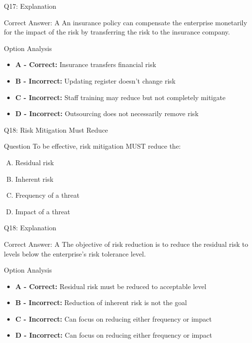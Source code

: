 \documentclass{beamer}
\begin{document}
	\begin{frame}{Q17: Explanation}
		\begin{block}{Correct Answer: A}
			An insurance policy can compensate the enterprise monetarily for the impact of the risk by transferring the risk to the insurance company.
		\end{block}
		\begin{block}{Option Analysis}
			\begin{itemize}
				\item \textbf{A - Correct:} Insurance transfers financial risk
				\item \textbf{B - Incorrect:} Updating register doesn't change risk
				\item \textbf{C - Incorrect:} Staff training may reduce but not completely mitigate
				\item \textbf{D - Incorrect:} Outsourcing does not necessarily remove risk
			\end{itemize}
		\end{block}
	\end{frame}
	
	\begin{frame}{Q18: Risk Mitigation Must Reduce}
		\begin{block}{Question}
			To be effective, risk mitigation MUST reduce the:
		\end{block}
		\begin{enumerate}[(A)]
			\item Residual risk
			\item Inherent risk
			\item Frequency of a threat
			\item Impact of a threat
		\end{enumerate}
	\end{frame}
	
	\begin{frame}{Q18: Explanation}
		\begin{block}{Correct Answer: A}
			The objective of risk reduction is to reduce the residual risk to levels below the enterprise's risk tolerance level.
		\end{block}
		\begin{block}{Option Analysis}
			\begin{itemize}
				\item \textbf{A - Correct:} Residual risk must be reduced to acceptable level
				\item \textbf{B - Incorrect:} Reduction of inherent risk is not the goal
				\item \textbf{C - Incorrect:} Can focus on reducing either frequency or impact
				\item \textbf{D - Incorrect:} Can focus on reducing either frequency or impact
			\end{itemize}
		\end{block}
	\end{frame}
	
\end{document}
